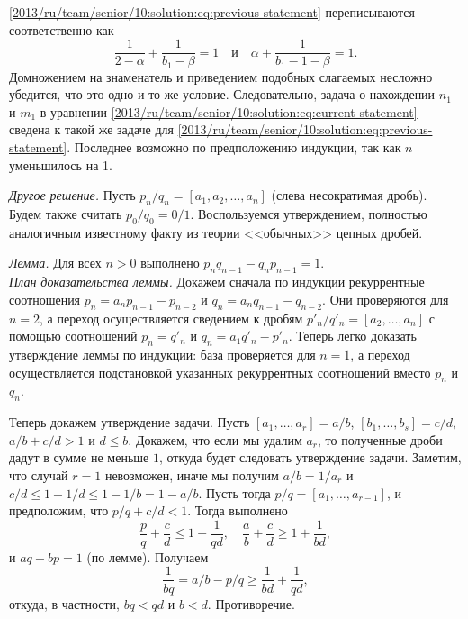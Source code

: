 \eqref{2013/ru/team/senior/10:solution:eq:previous-statement}
переписываются соответственно как
\[
    \frac{1}{2 - \alpha} + \frac{1}{b_1 - \beta} = 1
\quad\text{и}\quad
    \alpha + \frac{1}{b_1 - 1 - \beta} = 1
.\]
Домножением на знаменатель и приведением подобных слагаемых несложно убедится,
что это одно и то же условие.
Следовательно, задача о нахождении $n_1$ и $m_1$ в уравнении
\eqref{2013/ru/team/senior/10:solution:eq:current-statement}
сведена к такой же задаче для
\eqref{2013/ru/team/senior/10:solution:eq:previous-statement}.
Последнее возможно по предположению индукции, так как $n$ уменьшилось на 1.
\par
\emph{Другое решение.}
Пусть
\(
    p_n / q_n = [a_1, a_2, \ldots, a_n]
\)
(слева несократимая дробь).
Будем также считать $p_0 / q_0 = 0 / 1$.
Воспользуемся утверждением, полностью аналогичным известному факту из теории
<<обычных>> цепных дробей.
\par
\emph{Лемма.}
Для всех $n > 0$ выполнено $p_n q_{n-1} - q_n p_{n-1} = 1$.
\\
\emph{План доказательства леммы.}
Докажем сначала по индукции рекуррентные соотношения
$p_n = a_n p_{n-1} - p_{n-2}$ и $q_n = a_n q_{n-1} - q_{n-2}$.
Они проверяются для $n = 2$, а переход осуществляется сведением к дробям
\(
    p'_n / q'_n = [a_2, \ldots, a_n]
\) с помощью соотношений $p_n = q'_n$ и $q_n = a_1 q'_n - p'_n$.
Теперь легко доказать утверждение леммы по индукции: база проверяется для $n = 1$,
а переход осуществляется подстановкой указанных рекуррентных соотношений вместо
$p_n$ и $q_n$.
\par
Теперь докажем утверждение задачи.
Пусть
$[a_1, \ldots, a_r] = a / b$, $[b_1, \ldots, b_s] = c / d$,
$a / b + c / d > 1$ и $d \leq b$.
Докажем, что если мы удалим $a_r$, то полученные дроби дадут в сумме
не меньше $1$, откуда будет следовать утверждение задачи.
Заметим, что случай $r = 1$ невозможен, иначе мы получим
$a / b = 1 / a_r$ и
\(
    c / d \leq 1 - 1 / d
\leq
    1 - 1 / b = 1 - a / b
\).
Пусть тогда $p / q = [a_1, \ldots, a_{r-1}]$, и предположим, что
$p / q + c / d < 1$.
Тогда выполнено
\[
    \frac{p}{q} + \frac{c}{d}
\leq
    1 - \frac{1}{q d}
,\quad
    \frac{a}{b} + \frac{c}{d}
\geq
    1 + \frac{1}{b d}
,\]
и $a q - b p = 1$ (по лемме).
Получаем
\[
    \frac{1}{b q} = a / b - p / q
\geq
    \frac{1}{b d} + \frac{1}{q d},
\]
откуда, в частности, $b q < q d$ и $b < d$.
Противоречие.
\endproblem

